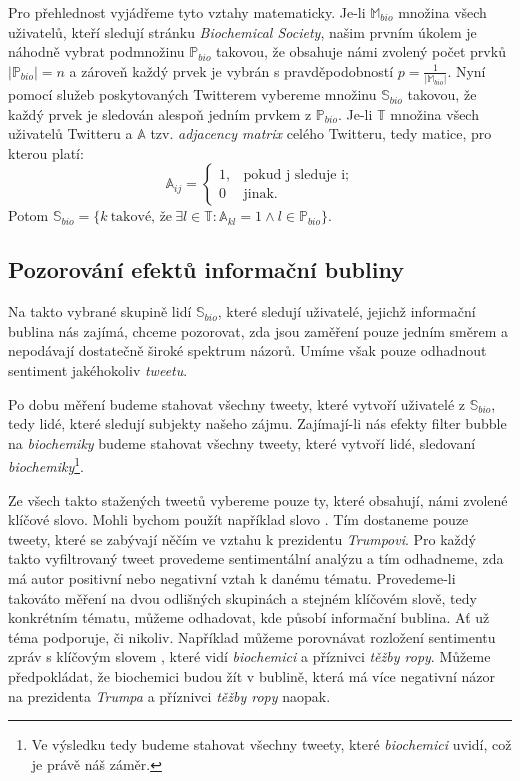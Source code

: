 \documentclass[12pt, a4paper]{article}
\numberwithin{equation}{section} 	%
\begin{document}
Pro přehlednost vyjádřeme tyto vztahy matematicky. Je-li $\mathbb{M}_{bio}$ množina všech uživatelů, kteří sledují stránku \textit{Biochemical Society}, našim prvním úkolem je náhodně vybrat podmnožinu $\mathbb{P}_{bio}$ takovou, že obsahuje námi zvolený počet prvků $\left\vert{\mathbb{P}_{bio}}\right\vert = n$ a zároveň každý prvek je vybrán s pravděpodobností $p = \frac{1}{\left\vert{\mathbb{M}_{bio}}\right\vert}$. Nyní pomocí služeb poskytovaných Twitterem vybereme množinu $\mathbb{S}_{bio}$ takovou, že každý prvek je sledován alespoň jedním prvkem z $\mathbb{P}_{bio}$. Je-li $\mathbb{T}$ množina všech uživatelů Twitteru a  $\mathbb{A}$ tzv. \textit{adjacency matrix} celého Twitteru, tedy matice, pro kterou platí:
\begin{equation}
    \mathbb{A}_{ij}=
    \begin{cases}
        1, &\text{pokud j sleduje i;}\\
        0 &\text{jinak.}
    \end{cases}
\end{equation}
Potom $\mathbb{S}_{bio} = \{k\ \text{takové, že}\ \exists l\in\mathbb{T}: \mathbb{A}_{kl} = 1 \wedge l\in\mathbb{P}_{bio} \}$.

\subsection{Pozorování efektů informační bubliny}
\noindent Na takto vybrané skupině lidí $\mathbb{S}_{bio}$, které sledují uživatelé, jejichž informační bublina nás zajímá, chceme pozorovat, zda jsou zaměření pouze jedním směrem a nepodávají dostatečně široké spektrum názorů. Umíme však pouze odhadnout sentiment jakéhokoliv \textit{tweetu}.

Po dobu měření budeme stahovat všechny tweety, které vytvoří uživatelé z $\mathbb{S}_{bio}$, tedy lidé, které sledují subjekty našeho zájmu. Zajímají-li nás efekty filter bubble na \textit{biochemiky} budeme stahovat všechny tweety, které vytvoří lidé, sledovaní \textit{biochemiky}\footnote{Ve výsledku tedy budeme stahovat všechny tweety, které \textit{biochemici} uvidí, což je právě náš záměr.}.

Ze všech takto stažených tweetů vybereme pouze ty, které obsahují, námi zvolené klíčové slovo. Mohli bychom použít například slovo \textit{}. Tím dostaneme pouze tweety, které se zabývají něčím ve vztahu k prezidentu \textit{Trumpovi}. Pro každý takto vyfiltrovaný tweet provedeme sentimentální analýzu a tím odhadneme, zda má autor positivní nebo negativní vztah k danému tématu. Provedeme-li takováto měření na dvou odlišných skupinách a stejném klíčovém slově, tedy konkrétním tématu, můžeme odhadovat, kde působí informační bublina. Ať už téma podporuje, či nikoliv. Například můžeme porovnávat rozložení sentimentu zpráv s klíčovým slovem \textit{}, které vidí \textit{biochemici} a příznivci \textit{těžby ropy}. Můžeme předpokládat, že biochemici budou žít v bublině, která má více negativní názor na prezidenta \textit{Trumpa} a příznivci \textit{těžby ropy} naopak.
\end{document}
